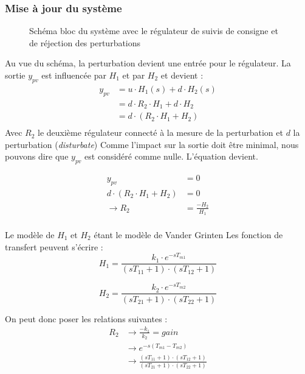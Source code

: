 
\subsubsection{Mise à jour du système}
\begin{figure}[h]


\caption{Schéma bloc du système avec le régulateur de suivis de consigne et de réjection des perturbations}
\end{figure}

Au vue du schéma, la perturbation devient une entrée pour le régulateur. La sortie  $y_{pv}$ est influencée par  $H_{1}$ et par $H_{2}$ et devient :\\

\begin{align}
y_{pv} &= u \cdot H_{1}(s) + d \cdot H_{2}(s)\\
	   &= d \cdot R_{2} \cdot H_{1} + d \cdot H_{2}\\
	   &= d \cdot (R_{2} \cdot H_{1} + H_{2})\\
\end{align}
Avec $R_{2}$ le deuxième régulateur connecté à la mesure de la perturbation et $d$ la perturbation (\textit{disturbate})
Comme l'impact sur la sortie doit être minimal, nous pouvons dire que $y_{pv}$ est considéré comme nulle. L'équation devient.

\begin{align}
y_{pv} &= 0\\
	d \cdot (R_{2} \cdot H_{1} + H_{2}) &= 0\\
	\rightarrow R_{2} &= \frac{-H_{2}}{H_{1}}\\
\end{align}


Le modèle de $H_{1}$  et $H_{2}$ étant le modèle de Vander Grinten Les fonction de transfert peuvent s'écrire :
\begin{equation}
H_{1} =  \frac{k_{1} \cdot e^{-sT_{m1}}}{(sT_{11} + 1) \cdot (sT_{12} + 1)}
\end{equation}

\begin{equation}
H_{2} =  \frac{k_{2} \cdot e^{-sT_{m2}}}{(sT_{21} + 1) \cdot (sT_{22} + 1)}
\end{equation}

On peut donc poser les relations suivantes :
\begin{align}
R_{2} &\rightarrow \frac{-k_{1}}{k_{2}} = gain\\
	  &\rightarrow e^{-s(T_{m1} - T_{m2})}\\
	  &\rightarrow \frac{(sT_{11} + 1) \cdot (sT_{12} + 1)}{(sT_{21} + 1) \cdot (sT_{22} + 1)}\\
\end{align}

